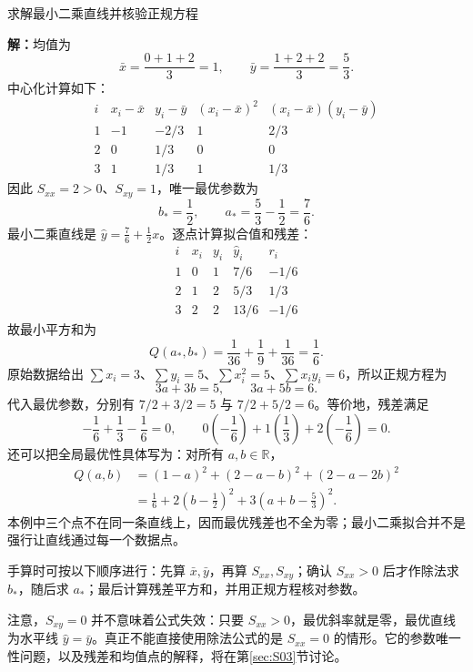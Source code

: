 \documentclass[aspectratio=169,10pt,fontset=fandol]{ctexbeamer}
\begin{document}
\begin{frame}[t,fragile]{求解最小二乘直线并核验正规方程}
\footnotesize
{\footnotesize
\par\noindent\textbf{解：}均值为
\[
\bar{x}=\frac{0+1+2}{3}=1,\qquad
\bar{y}=\frac{1+2+2}{3}=\frac53.
\]
中心化计算如下：
\[
\begin{array}{c|r|r|r|r}
i&x_i-\bar{x}&y_i-\bar{y}&(x_i-\bar{x})^2&(x_i-\bar{x})(y_i-\bar{y})\\ \hline
1&-1&-2/3&1&2/3\\
2&0&1/3&0&0\\
3&1&1/3&1&1/3
\end{array}
\]
因此 $S_{xx}=2>0$、$S_{xy}=1$，唯一最优参数为
\[
b_* =\frac12,\qquad a_* =\frac53-\frac12=\frac76.
\]
最小二乘直线是 $\hat{y}=\frac76+\frac12x$。逐点计算拟合值和残差：
\[
\begin{array}{c|r|r|r|r}
i&x_i&y_i&\hat{y}_i&r_i\\ \hline
1&0&1&7/6&-1/6\\
2&1&2&5/3&1/3\\
3&2&2&13/6&-1/6
\end{array}
\]
故最小平方和为
\[
Q(a_*,b_*)=\frac1{36}+\frac19+\frac1{36}=\frac16.
\]
原始数据给出 $\sum x_i=3$、$\sum y_i=5$、$\sum x_i^2=5$、$\sum x_i y_i=6$，所以正规方程为
\[
3a+3b=5,\qquad 3a+5b=6.
\]
代入最优参数，分别有 $7/2+3/2=5$ 与 $7/2+5/2=6$。等价地，残差满足
\[
-\frac16+\frac13-\frac16=0,\qquad
0\left(-\frac16\right)+1\left(\frac13\right)+2\left(-\frac16\right)=0.
\]
还可以把全局最优性具体写为：对所有 $a,b\in\mathbb{R}$，
\[
\begin{aligned}
Q(a,b)&=(1-a)^2+(2-a-b)^2+(2-a-2b)^2\\
&=\frac16+2\left(b-\frac12\right)^2+3\left(a+b-\frac53\right)^2.
\end{aligned}
\]
本例中三个点不在同一条直线上，因而最优残差也不全为零；最小二乘拟合并不是强行让直线通过每一个数据点。\par

}
{\footnotesize
手算时可按以下顺序进行：先算 $\bar{x},\bar{y}$，再算 $S_{xx},S_{xy}$；确认 $S_{xx}>0$ 后才作除法求 $b_*$，随后求 $a_*$；最后计算残差平方和，并用正规方程核对参数。


}
{\footnotesize
注意，$S_{xy}=0$ 并不意味着公式失效：只要 $S_{xx}>0$，最优斜率就是零，最优直线为水平线 $\hat{y}=\bar{y}$。真正不能直接使用除法公式的是 $S_{xx}=0$ 的情形。它的参数唯一性问题，以及残差和均值点的解释，将在第\ref{sec:S03}节讨论。\par

}
\end{frame}
\end{document}
